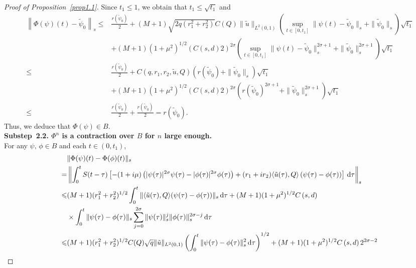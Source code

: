 \documentclass[review]{elsarticle}
\theoremstyle{dotless}
\def\d{{\,\rm d}}
\def \leq{\leqslant}
\numberwithin{equation}{section}
\begin{document}
\begin{proof}[Proof of Proposition~\ref{prop1.1}]
	Since $t_1\leq 1$, we obtain that $t_1\leq \sqrt{t_1}$ and 
	\begin{equation*}
		\begin{aligned}
			\left\|\Phi(\psi)(t)-\tilde{\psi}_0\right\|_{s} 
			\leq& \frac{r(\tilde{\psi}_0)}{2} + (M+1) \sqrt{2q( r_1^2+r_2^2)}  C(Q) \|\tilde{u}\|_{L^2(0,1)}\left( \sup _{t \in [0,t_1]} \|\psi(t)-\tilde{\psi}_0 \|_{s} + \|\tilde{\psi}_0\|_s \right)\sqrt{t_1}\\
			&+(M+1)(1+\mu^2)^{1/2}\left(C\left(s,d\right) 2\right)^{2\sigma}\left( \sup _{t \in [0,t_1]} \|\psi(t)-\tilde{\psi}_0 \|_{s}^{2\sigma+1} + \|\tilde{\psi}_0\|_s^{2\sigma+1} \right)\sqrt{t_1}\\
			\leq& \frac{r(\tilde{\psi}_0)}{2} + C(q,r_1,r_2, \tilde{u}, Q)\left( r(\tilde{\psi}_0) + \|\tilde{\psi}_0\|_s \right)\sqrt{t_1}\\
			&+(M+1)(1+\mu^2)^{1/2}\left(C\left(s,d\right) 2\right)^{2\sigma}\left(r(\tilde{\psi}_0)^{2\sigma+1} + \|\tilde{\psi}_0\|_s^{2\sigma+1} \right)\sqrt{t_1}\\
			\leq& \frac{r(\tilde{\psi}_0)}{2} + \frac{r(\tilde{\psi}_0)}{2}=r(\tilde{\psi}_0).
		\end{aligned}
	\end{equation*}
	Thus, we deduce that $ \Phi(\psi) \in B$.
	\\
	\textbf{Substep~2.2. $\Phi^n$ is a contraction over $B$ for $n$ large enough.}
	\\
	For any $\psi,\, \phi \in B$ and each $t\in (0,t_1)$,
	\begin{equation}\label{induction1}
		\begin{aligned}
			&\|\Phi(\psi)(t)-\Phi(\phi)(t)\|_{s}\\
			= & \left\|\int_0^t S(t-\tau)\left[-(1+i \mu)\left(|\psi(\tau)|^{2 \sigma} \psi(\tau)- |\phi(\tau)|^{2 \sigma} \phi(\tau)\right) +(r_1+ir_2)\langle \tilde{u}(\tau),Q\rangle\left(\psi(\tau)-\phi(\tau)\right)\right] \d \tau\right\|_{s} \\
			\leq & (M+1)(r_1^2+r_2^2)^{1/2}\int_0^t\|\langle \tilde{u}(\tau), Q\rangle(\psi(\tau)-\phi(\tau))\|_{s} \d \tau +(M+1)(1+\mu^2)^{1/2}C\left(s,d\right) \\
			&\times \int_0^t\|\psi(\tau)-\phi(\tau)\|_{s} \sum_{j=0}^{2\sigma}\|\psi(\tau)\|_{s}^j\|\phi(\tau)\|_{s}^{2\sigma-j} \d \tau \\
			\leq &(M+1) (r_1^2+r_2^2)^{1/2}C(Q) \sqrt{ q}\|\tilde{u}\|_{L^2(0,1)}\left(\int_0^t\|\psi(\tau)-\phi(\tau)\|_{s}^2 \d \tau\right)^{1 / 2} +(M+1)(1+\mu^2)^{1/2}C\left(s,d\right) 2^{2\sigma-2}\\

\end{aligned}
\end{equation}
\end{proof}
\end{document}
